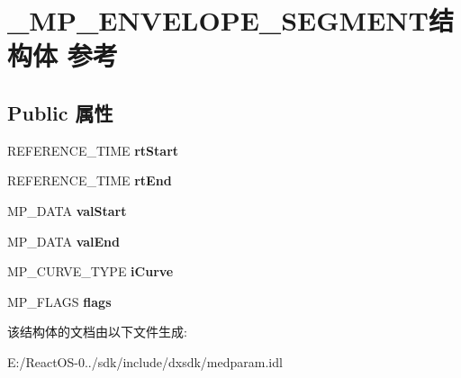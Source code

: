 \hypertarget{struct___m_p___e_n_v_e_l_o_p_e___s_e_g_m_e_n_t}{}\section{\+\_\+\+M\+P\+\_\+\+E\+N\+V\+E\+L\+O\+P\+E\+\_\+\+S\+E\+G\+M\+E\+N\+T结构体 参考}
\label{struct___m_p___e_n_v_e_l_o_p_e___s_e_g_m_e_n_t}
\subsection*{Public 属性}
\begin{DoxyCompactItemize}
\item 
\mbox{\label{struct___m_p___e_n_v_e_l_o_p_e___s_e_g_m_e_n_t_a9e7be667cde9482f6d169113632f3405}} 
R\+E\+F\+E\+R\+E\+N\+C\+E\+\_\+\+T\+I\+ME {\bfseries rt\+Start}
\item 
\mbox{\label{struct___m_p___e_n_v_e_l_o_p_e___s_e_g_m_e_n_t_ac71b2d4261a552536214e34e6c1eb7ff}} 
R\+E\+F\+E\+R\+E\+N\+C\+E\+\_\+\+T\+I\+ME {\bfseries rt\+End}
\item 
\mbox{\label{struct___m_p___e_n_v_e_l_o_p_e___s_e_g_m_e_n_t_a8c5f599a893b42c3921402cc249e62c0}} 
M\+P\+\_\+\+D\+A\+TA {\bfseries val\+Start}
\item 
\mbox{\label{struct___m_p___e_n_v_e_l_o_p_e___s_e_g_m_e_n_t_a0c585db5e6a59855045d2627e75a5a23}} 
M\+P\+\_\+\+D\+A\+TA {\bfseries val\+End}
\item 
\mbox{\label{struct___m_p___e_n_v_e_l_o_p_e___s_e_g_m_e_n_t_a693c549f8cdd7235aab6a026b15822fc}} 
M\+P\+\_\+\+C\+U\+R\+V\+E\+\_\+\+T\+Y\+PE {\bfseries i\+Curve}
\item 
\mbox{\label{struct___m_p___e_n_v_e_l_o_p_e___s_e_g_m_e_n_t_a6bcc37a79509ebd16e2b12c835797451}} 
M\+P\+\_\+\+F\+L\+A\+GS {\bfseries flags}
\end{DoxyCompactItemize}


该结构体的文档由以下文件生成\+:\begin{DoxyCompactItemize}
\item 
E\+:/\+React\+O\+S-\/0../sdk/include/dxsdk/medparam.\+idl\end{DoxyCompactItemize}
